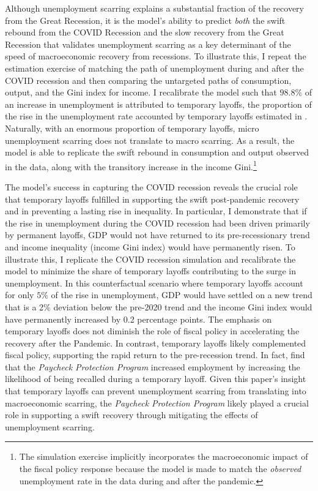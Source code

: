  Although unemployment scarring explains a substantial fraction of the recovery from the Great Recession, it is the model's ability to predict \textit{both} the swift rebound from the COVID Recession and the slow recovery from the Great Recession that validates unemployment scarring as a key determinant of the speed of macroeconomic recovery from recessions. To illustrate this, I repeat the estimation exercise of matching the path of unemployment during and after the COVID recession and then comparing the untargeted paths of consumption, output, and the Gini index for income. I recalibrate the model such that $98.8\%$ of an increase in unemployment is attributed to temporary layoffs, the proportion of the rise in the unemployment rate accounted by temporary layoffs estimated in \cite{Gertler2022}. Naturally, with an enormous proportion of temporary layoffs, micro unemployment scarring does not translate to macro scarring.  As a result, the model is able to replicate the swift rebound in consumption and output observed in the data, along with the transitory increase in the income Gini.\footnote{The simulation exercise implicitly incorporates the macroeconomic impact of the fiscal policy response because the model is made to match the \textit{observed} unemployment rate in the data during and after the pandemic.} 

The model's success in capturing the COVID recession reveals the crucial role that temporary layoffs fulfilled in supporting the swift post-pandemic recovery and in preventing a lasting rise in inequality. In particular, I demonstrate that if the rise in unemployment during the COVID recession had been driven primarily by permanent layoffs, GDP would not have returned to its pre-recessionary trend and income inequality (income Gini index) would have permanently risen. To illustrate this, I replicate the COVID recession simulation and recalibrate the model to minimize the share of temporary layoffs contributing to the surge in unemployment. In this counterfactual scenario where temporary layoffs account for only $5\%$ of the rise in unemployment, GDP would have settled on a new trend that is a 2$\%$ deviation below the pre-2020 trend and the income Gini index would have permanently increased by 0.2 percentage points. The emphasis on temporary layoffs does not diminish the role of fiscal policy in accelerating the recovery after the Pandemic. In contrast, temporary layoffs likely complemented fiscal policy, supporting the rapid return to the pre-recession trend. In fact, \cite{Gertler2022} find that the \textit{Paycheck Protection Program} increased employment by increasing the likelihood of being recalled during a temporary layoff. Given this paper's insight that temporary layoffs can prevent unemployment scarring from translating into macroeconomic scarring, the \textit{Paycheck Protection Program} likely played a crucial role in supporting a swift recovery through mitigating the effects of unemployment scarring.


